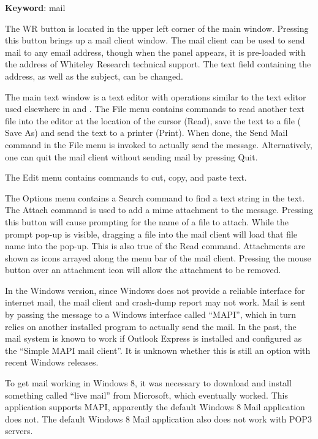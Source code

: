 {\bf Keyword}: {\vt mail}

The {\cb WR} button is located in the upper left corner of the {\Xic}
main window.  Pressing this button brings up a mail client window. 
The mail client can be used to send mail to any email address, though
when the panel appears, it is pre-loaded with the address of Whiteley
Research technical support.  The text field containing the address, as
well as the subject, can be changed.

The main text window is a text editor with operations similar to the
text editor used elsewhere in {\Xic} and {\WRspice}.  The {\cb File}
menu contains commands to read another text file into the editor at
the location of the cursor ({\cb Read}), save the text to a file ({\cb
Save As}) and send the text to a printer ({\cb Print}).  When done,
the {\cb Send Mail} command in the {\cb File} menu is invoked to
actually send the message.  Alternatively, one can quit the mail
client without sending mail by pressing {\cb Quit}.

The {\cb Edit} menu contains commands to cut, copy, and paste text.

The {\cb Options} menu contains a {\cb Search} command to find a text
string in the text.  The {\cb Attach} command is used to add a {\et mime}
attachment to the message.  Pressing this button will cause prompting
for the name of a file to attach.  While the prompt pop-up is visible,
dragging a file into the mail client will load that file name into the
pop-up.  This is also true of the {\cb Read} command.  Attachments are
shown as icons arrayed along the menu bar of the mail client. 
Pressing the mouse button over an attachment icon will allow the
attachment to be removed.

In the Windows version, since Windows does not provide a reliable
interface for internet mail, the mail client and crash-dump report may
not work.  Mail is sent by passing the message to a Windows interface
called ``MAPI'', which in turn relies on another installed program to
actually send the mail.  In the past, the mail system is known to work
if Outlook Express is installed and configured as the ``Simple MAPI
mail client''.  It is unknown whether this is still an option with
recent Windows releases.

To get mail working in Windows 8, it was necessary to download and
install something called ``{\cb live mail}'' from Microsoft, which
eventually worked.  This application supports MAPI, apparently the
default Windows 8 Mail application does not.  The default Windows 8
Mail application also does not work with POP3 servers.


